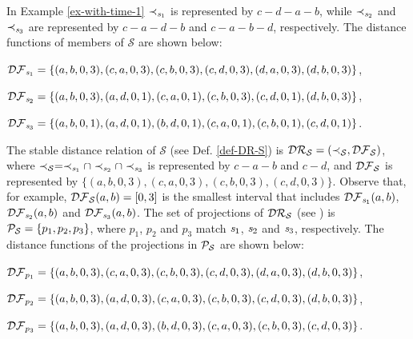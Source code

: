 In Example \ref{ex-with-time-1}
$\prec_{\mathit{s}_1}$ is represented by $c-d-a-b$, while $\prec_{\mathit{s}_2}$ and
$\prec_{\mathit{s}_3}$ are represented by $c-a-d-b$ and $c-a-b-d$, respectively.
The distance functions of members of $\mathcal{S}$ are shown below:

$\mathcal{DF}_{\mathit{s}_1}=
\{
(a, b, 0, 3),
 (c, a, 0, 3),
(c, b, 0, 3),
 (c, d, 0, 3),
(d, a, 0, 3),
(d, b, 0, 3)
\}$,

$\mathcal{DF}_{\mathit{s}_2}=
\{
(a, b, 0, 3),
(a, d, 0, 1),
(c, a, 0, 1),
(c, b, 0, 3),
(c, d, 0, 1),
(d, b, 0, 3)\}$,

$\mathcal{DF}_{\mathit{s}_3}=
\{
(a, b, 0, 1),
(a, d, 0, 1),
(b, d, 0, 1),
(c, a, 0, 1),
(c, b, 0, 1),
(c, d, 0, 1)
\}$.

The stable distance relation
of $\mathcal{S}$ (see Def. \ref{def-DR-S})
is $\mathcal{DR}_{\mathcal{S}}=(\prec_{\mathcal{S}},\mathcal{DF}_{\mathcal{S}})$, where
$\prec_{\mathcal{S}}=\prec_{\mathit{s}_1}\cap\prec_{\mathit{s}_2}\cap\prec_{\mathit{s}_3}$ is
represented by $c-a-b$ and $c-d$, and
 $\mathcal{DF}_{\mathcal{S}}$ is represented by
 $\{
(a, b, 0, 3),
(c, a, 0, 3),
(c, b, 0, 3),
(c, d, 0, 3)\}$.
Observe that, for example, $\mathcal{DF}_{\mathcal{S}}(a,b)=[0,3]$ is the
smallest interval that includes $\mathcal{DF}_{\mathit{s}_1}(a,b)$,
$\mathcal{DF}_{\mathit{s}_2}(a,b)$ and $\mathcal{DF}_{\mathit{s}_3}(a,b)$.
The set of projections of $\mathcal{DR}_{\mathcal{S}}$ (see ) is
$\mathcal{P}_{\mathcal{S}}=\{p_1,p_2,p_3\}$, where
$p_1$, $p_2$ and $p_3$ match $\mathit{s}_1$, $\mathit{s}_2$ and
$\mathit{s}_3$, respectively.
The distance functions of the projections in $\mathcal{P}_{\mathcal{S}}$ are
shown below:

$\mathcal{DF}_{p_1}=
\{
(a, b, 0, 3),
 (c, a, 0, 3),
(c, b, 0, 3),
 (c, d, 0, 3),
(d, a, 0, 3),
(d, b, 0, 3)
\}$,

$\mathcal{DF}_{p_2}=
\{
(a, b, 0, 3),
(a, d, 0, 3),
(c, a, 0, 3),
(c, b, 0, 3),
(c, d, 0, 3),
(d, b, 0, 3)\}$,

$\mathcal{DF}_{p_3}=
\{
(a, b, 0, 3),
(a, d, 0, 3),
(b, d, 0, 3),
(c, a, 0, 3),
(c, b, 0, 3),
(c, d, 0, 3)
\}$.

